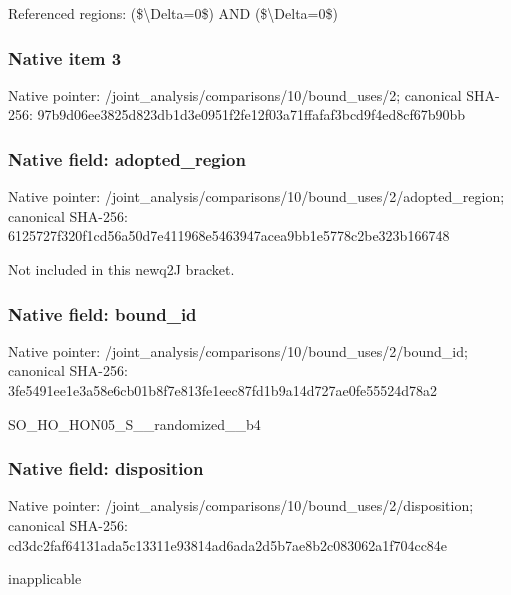 \documentclass[10pt,a4paper]{article}
\begin{document}
\begingroup\raggedright\sloppy Referenced regions:\allowbreak{} (\$\textbackslash{}Delta=\allowbreak{}0\$) AND (\$\textbackslash{}Delta=\allowbreak{}0\$)\par\endgroup

\subsubsection{Native item 3}
Native pointer: /joint\_\allowbreak{}analysis/comparisons/10/bound\_\allowbreak{}uses/2; canonical SHA-256: 97b9d06ee3825d823db1d3e0951f2fe12f03a71ffafaf3bcd9f4ed8cf67b90bb

\subsubsection{Native field: adopted\_\allowbreak{}region}
Native pointer: /joint\_\allowbreak{}analysis/comparisons/10/bound\_\allowbreak{}uses/2/adopted\_\allowbreak{}region; canonical SHA-256: 6125727f320f1cd56a50d7e411968e5463947acea9bb1e5778c2be323b166748

\begingroup\raggedright\sloppy Not included in this newq2J bracket.\par\endgroup

\subsubsection{Native field: bound\_\allowbreak{}id}
Native pointer: /joint\_\allowbreak{}analysis/comparisons/10/bound\_\allowbreak{}uses/2/bound\_\allowbreak{}id; canonical SHA-256: 3fe5491ee1e3a58e6cb01b8f7e813fe1eec87fd1b9a14d727ae0fe55524d78a2

\begingroup\raggedright\sloppy SO\_\allowbreak{}HO\_\allowbreak{}HON05\_\allowbreak{}S\_\allowbreak{}\_\allowbreak{}randomized\_\allowbreak{}\_\allowbreak{}b4\par\endgroup

\subsubsection{Native field: disposition}
Native pointer: /joint\_\allowbreak{}analysis/comparisons/10/bound\_\allowbreak{}uses/2/disposition; canonical SHA-256: cd3dc2faf64131ada5c13311e93814ad6ada2d5b7ae8b2c083062a1f704cc84e

\begingroup\raggedright\sloppy inapplicable\par\endgroup
\end{document}
